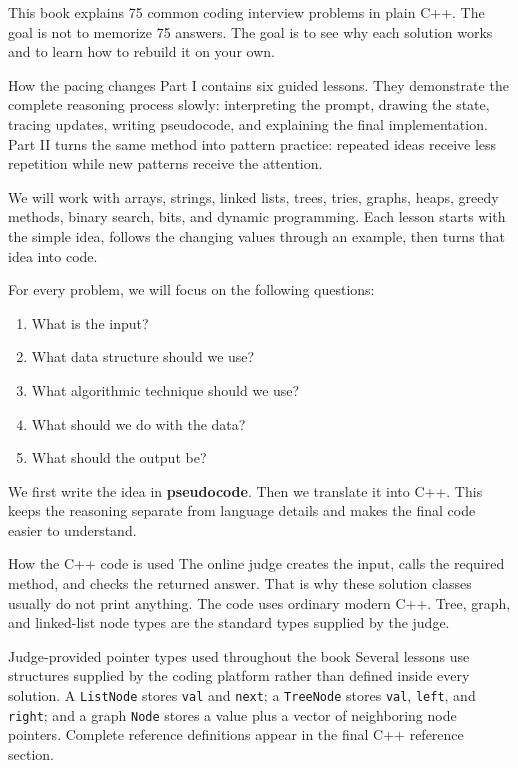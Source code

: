 \documentclass[12pt,oneside]{article}
\newcounter{lesson}
\begin{document}
This book explains 75 common coding interview problems in plain C++. The goal
is not to memorize 75 answers. The goal is to see why each solution works and
to learn how to rebuild it on your own.

\begin{conceptbox}{How the pacing changes}
Part I contains six guided lessons. They demonstrate the complete
reasoning process slowly: interpreting the prompt, drawing the state, tracing
updates, writing pseudocode, and explaining the final implementation. Part II
turns the same method into pattern practice: repeated ideas receive less
repetition while new patterns receive the attention.
\end{conceptbox}

We will work with arrays, strings, linked lists, trees, tries, graphs, heaps,
greedy methods, binary search, bits, and dynamic programming. Each lesson
starts with the simple idea, follows the changing values through an example,
then turns that idea into code.

For every problem, we will focus on the following questions:

\begin{enumerate}
    \item What is the input?
    \item What data structure should we use?
    \item What algorithmic technique should we use?
    \item What should we do with the data?
    \item What should the output be?
\end{enumerate}

We first write the idea in \textbf{pseudocode}. Then we translate it into C++.
This keeps the reasoning separate from language details and makes the final
code easier to understand.

\begin{conceptbox}{How the C++ code is used}
The online judge creates the input, calls the required method, and checks the returned
answer. That is why these solution classes usually do not print anything.
The code uses ordinary modern C++. Tree, graph, and linked-list node types are
the standard types supplied by the judge.
\end{conceptbox}

\begin{conceptbox}{Judge-provided pointer types used throughout the book}
Several lessons use structures supplied by the coding platform rather than
defined inside every solution. A \texttt{ListNode} stores
\texttt{val} and \texttt{next}; a \texttt{TreeNode} stores \texttt{val},
\texttt{left}, and \texttt{right}; and a graph \texttt{Node} stores a value
plus a vector of neighboring node pointers. Complete reference definitions
appear in the final C++ reference section.
\end{conceptbox}
\end{document}
